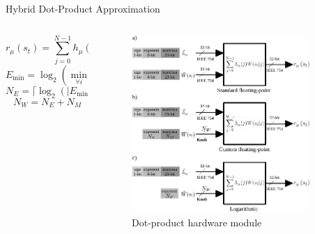 \begin{frame}{Hybrid Dot-Product Approximation}
	\begin{columns}[t] %
		\begin{column}{0.5\textwidth}

			\begin{equation}
			r_{\mu}\left(s_t\right)=\sum_{j=0}^{N-1}h_{\mu}(j)W(s_t|j)
			\end{equation}
			\vspace{4mm} 
			\begin{equation}
			E_{\min}=\log _2(\min_{\forall i}(W(i)))
			\end{equation}
			\vspace{4mm} 
			\begin{equation}
			N_E=\lceil\log_2(|E_{\min}|)\rceil
			\end{equation}
			\vspace{4mm} 
			\begin{equation}
			N_W=N_E + N_M
			\end{equation}
		\end{column}
		
		\begin{column}{0.5\textwidth}
			\begin{figure}
				\centering
				\includegraphics[width=0.9\textwidth]{../chapters/sbs_accelerator/figures/dot-product_unit.pdf} %
				\caption{Dot-product hardware module}
			\end{figure}
		\end{column}
	\end{columns}
\end{frame}

